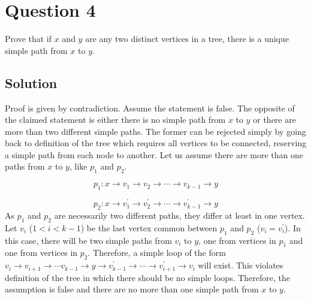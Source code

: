 
\section*{Question 4}

Prove that if $x$ and $y$ are any two distinct vertices in a tree, there is a unique simple path from $x$ to $y$.

\subsection*{Solution}

Proof is given by contradiction.
Assume the statement is false.
The opposite of the claimed statement is either there is no simple path from $x$ to $y$ or there are more than two different simple paths.
The former can be rejected simply by going back to definition of the tree which requires all vertices to be connected, reserving a simple path from each node to another.
Let us assume there are more than one paths from $x$ to $y$, like $p_1$ and $p_2$.

\begin{equation}
p_1: x \rightarrow v_1 \rightarrow v_2 \rightarrow \cdots \rightarrow v_{k-1} \rightarrow y
\end{equation}

\begin{equation}
p_2: x \rightarrow v_{1}^{\prime} \rightarrow v_{2}^{\prime} \rightarrow \cdots \rightarrow v_{k-1}^{\prime} \rightarrow y
\end{equation}
As $p_1$ and $p_2$ are necessarily two different paths, they differ at least in one vertex.
Let $v_i$ ($1<i<k-1$) be the last vertex common between $p_1$ and $p_2$ ($v_i = v_{i}^{\prime}$).
In this case, there will be two simple paths from $v_i$ to $y$, one from vertices in $p_1$ and one from vertices in $p_2$.
Therefore, a simple loop of the form $v_i \rightarrow v_{i+1} \rightarrow \cdots v_{k-1} \rightarrow y \rightarrow v_{k-1}^{\prime} \rightarrow \cdots \rightarrow v_{i+1}^{\prime} \rightarrow v_i$ will exist.
This violates definition of the tree in which there should be no simple loops.
Therefore, the assumption is false and there are no more than one simple path from $x$ to $y$.
